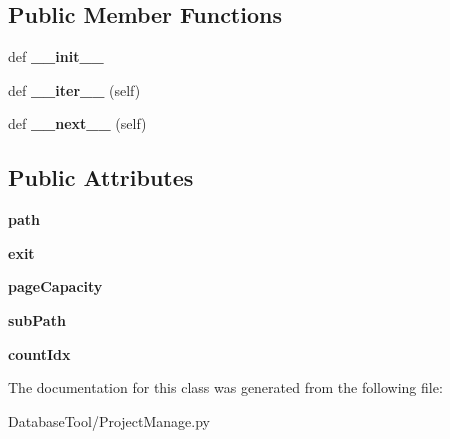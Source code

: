 \subsection*{Public Member Functions}
\begin{DoxyCompactItemize}
\item 
\mbox{\label{classMIS_1_1DatabaseTool_1_1ProjectManage_1_1Cormis__CachingHDFIterator_a429cde8579321cf7ab2376cdf2063e80}} 
def {\bfseries \+\_\+\+\_\+init\+\_\+\+\_\+}
\item 
\mbox{\label{classMIS_1_1DatabaseTool_1_1ProjectManage_1_1Cormis__CachingHDFIterator_aa8a13b526620d9ba1258dadb72d7e358}} 
def {\bfseries \+\_\+\+\_\+iter\+\_\+\+\_\+} (self)
\item 
\mbox{\label{classMIS_1_1DatabaseTool_1_1ProjectManage_1_1Cormis__CachingHDFIterator_ac7c63f6c6c4004070e0dad732eb2238c}} 
def {\bfseries \+\_\+\+\_\+next\+\_\+\+\_\+} (self)
\end{DoxyCompactItemize}
\subsection*{Public Attributes}
\begin{DoxyCompactItemize}
\item 
\mbox{\label{classMIS_1_1DatabaseTool_1_1ProjectManage_1_1Cormis__CachingHDFIterator_a7d3aa5145b5119f2c4655a1f643edd51}} 
{\bfseries path}
\item 
\mbox{\label{classMIS_1_1DatabaseTool_1_1ProjectManage_1_1Cormis__CachingHDFIterator_a9ed5417eb43e05ed2d0b297763a66789}} 
{\bfseries exit}
\item 
\mbox{\label{classMIS_1_1DatabaseTool_1_1ProjectManage_1_1Cormis__CachingHDFIterator_a2774fc337416f7475073401a89a8dff9}} 
{\bfseries page\+Capacity}
\item 
\mbox{\label{classMIS_1_1DatabaseTool_1_1ProjectManage_1_1Cormis__CachingHDFIterator_adac18610af94edcb2f1d1bc0bb2ae0fb}} 
{\bfseries sub\+Path}
\item 
\mbox{\label{classMIS_1_1DatabaseTool_1_1ProjectManage_1_1Cormis__CachingHDFIterator_a4e6a519fb9cbce1d44bc1009d440429d}} 
{\bfseries count\+Idx}
\end{DoxyCompactItemize}


The documentation for this class was generated from the following file\+:\begin{DoxyCompactItemize}
\item 
Database\+Tool/Project\+Manage.\+py\end{DoxyCompactItemize}
